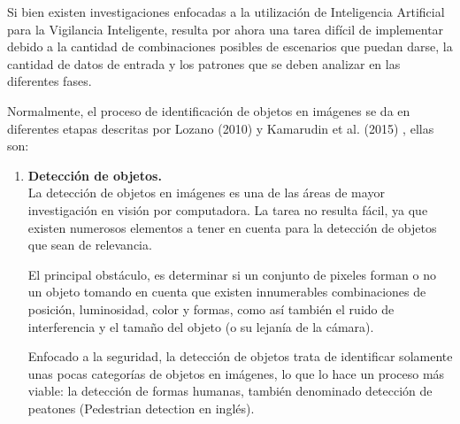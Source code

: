 \documentclass[a4paper,12pt,oneside,spanish]{book}
\begin{document}
Si bien existen investigaciones enfocadas a la utilización de Inteligencia Artificial para la Vigilancia Inteligente, resulta por ahora una tarea difícil de implementar debido a la cantidad de combinaciones posibles de escenarios que puedan darse, la cantidad de datos de entrada y los patrones que se deben analizar en las diferentes fases. \par

Normalmente, el proceso de identificación de objetos en imágenes se da en diferentes etapas descritas por Lozano (2010)\cite{lozano} y Kamarudin et al. (2015) \cite{kamarudin}, ellas son:	
\begin{enumerate}[label=\alph*)]
	\item \textbf{Detección de objetos.}\\
		La detección de objetos en imágenes es una de las áreas de mayor investigación en visión por computadora. La tarea no resulta fácil, ya que existen numerosos elementos a tener en cuenta para la detección de objetos que sean de relevancia. \par
		
		El principal obstáculo, es determinar si un conjunto de pixeles forman o no un objeto tomando en cuenta que existen innumerables combinaciones de posición, luminosidad, color y formas, como así también el ruido de interferencia y el tamaño del objeto (o su lejanía de la cámara).\par
		
		Enfocado a la seguridad, la detección de objetos trata de identificar solamente unas pocas categorías de objetos en imágenes, lo que lo hace un proceso más viable: la detección de formas humanas, también denominado detección de peatones (Pedestrian detection en inglés).
		

\end{enumerate}
\end{document}
